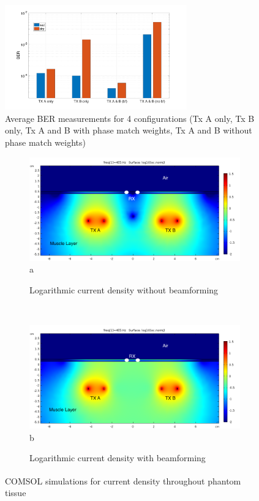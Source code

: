  \begin{figure}[t]
    \centering
	\includegraphics[width=0.7\textwidth]{figures/GC_beamforming/BER_plot_finall.pdf} 
	\caption{\label{fig:BER} Average BER measurements for 4 configurations (Tx A only, Tx B only, Tx A and B with phase match weights, Tx A and B without phase match weights) }
\vspace{-3mm}
\end{figure}

\begin{figure}[t!]
\centering

    \begin{subfigure}[b]{0.5\textwidth}
        \centering
        \includegraphics[width=0.95\linewidth]{figures/GC_beamforming/comsol_nobf.png}{a}
        \caption{Logarithmic current density without beamforming} 
        \label{F:nobeamf}
    \end{subfigure}%
    ~
    \begin{subfigure}[b]{0.5\textwidth}
        \centering
        \includegraphics[width=0.95\linewidth]{figures/GC_beamforming/comsol_bf.png}{b}
        \caption{Logarithmic current density with beamforming}
        \label{F:beamf}
    \end{subfigure}
    \caption{COMSOL\textsuperscript{\textregistered} simulations for current density throughout phantom tissue}
    \label{F:comsol}
\end{figure}

